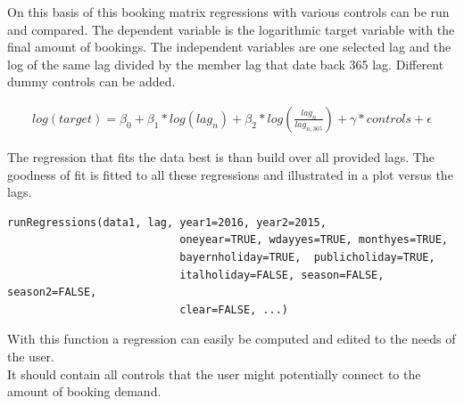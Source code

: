 \documentclass[nojss]{jss}
\begin{document}
On this basis of this booking matrix regressions with various controls can be run and compared. The dependent variable is the logarithmic target variable with the final amount of bookings. The independent variables are one selected lag and the log of the same lag divided by the member lag that date back 365 lag. Different dummy controls can be added.

\begin{align*}
   log(target) = \beta_{0} + \beta_{1}*log(lag_{n}) + \beta_{2}*log(\frac{lag_{n}}{lag_{n,365}}) + \gamma*controls +         \epsilon
\end{align*}

The regression that fits the data best is than build over all provided lags. The goodness of fit is fitted to all these regressions and illustrated in a plot versus the lags.

\begin{verbatim}
runRegressions(data1, lag, year1=2016, year2=2015, 
                           oneyear=TRUE, wdayyes=TRUE, monthyes=TRUE, 
                           bayernholiday=TRUE,  publicholiday=TRUE,
                           italholiday=FALSE, season=FALSE, season2=FALSE, 
                           clear=FALSE, ...)
\end{verbatim}


With this function a regression can easily be computed and edited to the needs of the user. \\
It should contain all controls that the user might potentially connect to the amount of booking demand.
\end{document}

